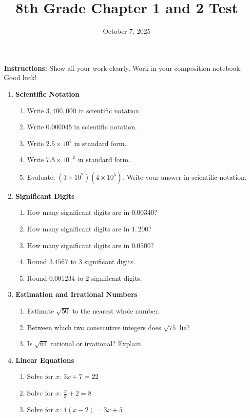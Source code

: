 \documentclass[12pt]{article}
\title{8th Grade Chapter 1 and 2 Test}
\date{October 7, 2025}
\begin{document}
\maketitle

\textbf{Instructions:} Show all your work clearly. Work in your composition notebook. Good luck!

\begin{enumerate}
    \item \textbf{Scientific Notation}
    \begin{enumerate}
        \item Write $3,400,000$ in scientific notation.
        \item Write $0.000045$ in scientific notation.
        \item Write $2.5 \times 10^4$ in standard form.
        \item Write $7.8 \times 10^{-3}$ in standard form.
        \item Evaluate: $(3 \times 10^2)(4 \times 10^5)$. Write your answer in scientific notation.
    \end{enumerate}

    \item \textbf{Significant Digits}
    \begin{enumerate}
        \item How many significant digits are in $0.00340$?
        \item How many significant digits are in $1,200$?
        \item How many significant digits are in $0.0500$?
        \item Round $3.4567$ to 3 significant digits.
        \item Round $0.001234$ to 2 significant digits.
    \end{enumerate}


    \item \textbf{Estimation and Irrational Numbers}
    \begin{enumerate}
        \item Estimate $\sqrt{50}$ to the nearest whole number.
        \item Between which two consecutive integers does $\sqrt{75}$ lie?
        \item Is $\sqrt{64}$ rational or irrational? Explain.
    \end{enumerate}

    \vspace{1in}

    \item \textbf{Linear Equations}
    \begin{enumerate}
        \item Solve for $x$: $3x + 7 = 22$
        \item Solve for $x$: $\frac{x}{3} + 2 = 8$
        \item Solve for $x$: $4(x - 2) = 3x + 5$
    \end{enumerate}


\end{enumerate}
\end{document}
